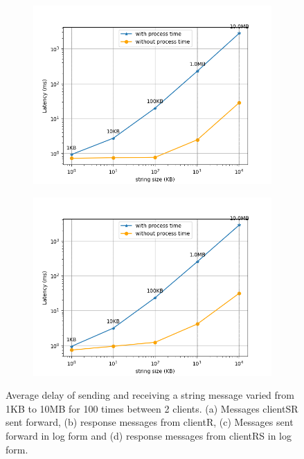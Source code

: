 \begin{figure}[htb]
\begin{subfigure}[b]{0.49\textwidth}
        \end{subfigure}
    \begin{subfigure}[b]{0.49\textwidth}
        \centering
        \includegraphics[width=\textwidth]{figures/tests/proportional_tests/log_Average_string_messages_sending_time_of_100_tests_1KB_to_10MB.png}\hfill 
        \caption{} \label{fig: proportional-stringsize-c}
    \end{subfigure}
    \begin{subfigure}[b]{0.49\textwidth}
        \centering
        \includegraphics[width=\textwidth]{figures/tests/proportional_tests/log_Average_string_messages_receiving_time_of_100_tests_1KB_to_10MB.png}\hfill 
        \caption{} \label{fig: proportional-stringsize-d}
    \end{subfigure}
    \caption{Average delay of sending and receiving a string message varied from 1KB 
    to 10MB for 100 times between 2 clients. (a) Messages clientSR sent forward, 
    (b) response messages from clientR, (c) Messages sent forward in log form 
    and (d) response messages from clientRS in log form. 
    \label{fig: proportional-stringsize}}
\end{figure}

